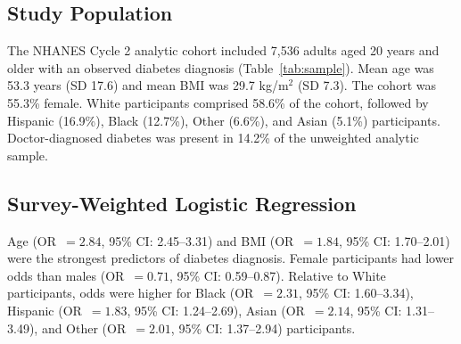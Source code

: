 \documentclass[11pt]{article}
\begin{document}
\subsection{Study Population}
The NHANES Cycle 2 analytic cohort included 7,536 adults aged 20 years and
older with an observed diabetes diagnosis (Table~\ref{tab:sample}). Mean age
was 53.3 years (SD 17.6) and mean BMI was 29.7 kg/m$^2$ (SD 7.3). The cohort
was 55.3\% female. White participants comprised 58.6\% of the cohort,
followed by Hispanic (16.9\%), Black (12.7\%), Other (6.6\%), and Asian
(5.1\%) participants. Doctor-diagnosed diabetes was present in 14.2\% of the
unweighted analytic sample.

\subsection{Survey-Weighted Logistic Regression}
Age (OR~$=2.84$, 95\% CI: 2.45--3.31) and BMI (OR~$=1.84$, 95\% CI:
1.70--2.01) were the strongest predictors of diabetes diagnosis. Female
participants had lower odds than males (OR~$=0.71$, 95\% CI: 0.59--0.87).
Relative to White participants, odds were higher for Black (OR~$=2.31$,
95\% CI: 1.60--3.34), Hispanic (OR~$=1.83$, 95\% CI: 1.24--2.69), Asian
(OR~$=2.14$, 95\% CI: 1.31--3.49), and Other (OR~$=2.01$, 95\% CI:
1.37--2.94) participants.
\end{document}
